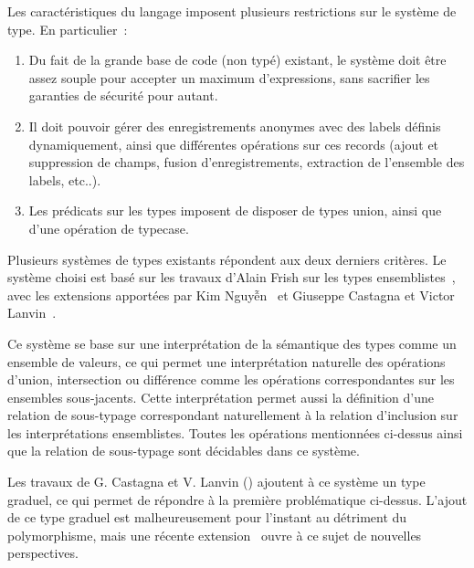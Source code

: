 Les caractéristiques du langage imposent plusieurs restrictions sur le système
de type. En particulier :

\begin{enumerate}
  \item Du fait de la grande base de code (non typé) existant, le système doit
    être assez souple pour accepter un maximum d'expressions, sans sacrifier
    les garanties de sécurité pour autant.

  \item Il doit pouvoir gérer des enregistrements anonymes avec des labels
    définis dynamiquement, ainsi que différentes opérations sur ces records
    (ajout et suppression de champs, fusion d'enregistrements, extraction de
    l'ensemble des labels, etc..).

  \item Les prédicats sur les types imposent de disposer de types union, ainsi
    que d'une opération de typecase.
\end{enumerate}

Plusieurs systèmes de types existants répondent aux deux derniers critères. Le
système choisi est basé sur les travaux d'Alain Frish sur les types
ensemblistes \cite{Fri04}, avec les extensions apportées par Kim
Nguyễn \cite{phdkim} et Giuseppe Castagna et Victor Lanvin \cite{CL17}.

Ce système se base sur une interprétation de la sémantique des types comme un
ensemble de valeurs, ce qui permet une interprétation naturelle des opérations
d'union, intersection ou différence comme les opérations correspondantes sur
les ensembles sous-jacents.
Cette interprétation permet aussi la définition d'une relation de sous-typage
correspondant naturellement à la relation d'inclusion sur les interprétations
ensemblistes.
Toutes les opérations mentionnées ci-dessus ainsi que la relation de
sous-typage sont décidables dans ce système.

Les travaux de G. Castagna et V. Lanvin (\cite{CL17}) ajoutent à ce système un
type graduel, ce qui permet de répondre à la première problématique ci-dessus.
L'ajout de ce type graduel est malheureusement pour l'instant au détriment du
polymorphisme, mais une récente extension \cite{Call18} ouvre à ce sujet de
nouvelles perspectives.
